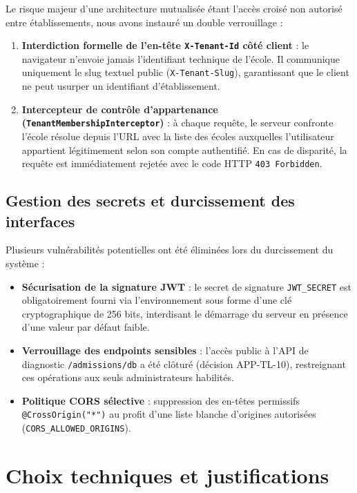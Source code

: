 Le risque majeur d'une architecture mutualisée étant l'accès croisé non autorisé entre établissements, nous avons instauré un double verrouillage :
\begin{enumerate}
    \item \textbf{Interdiction formelle de l'en-tête \texttt{X-Tenant-Id} côté client} : le navigateur n'envoie jamais l'identifiant technique de l'école. Il communique uniquement le slug textuel public (\texttt{X-Tenant-Slug}), garantissant que le client ne peut usurper un identifiant d'établissement.
    \item \textbf{Intercepteur de contrôle d'appartenance (\texttt{TenantMembershipInterceptor})} : à chaque requête, le serveur confronte l'école résolue depuis l'URL avec la liste des écoles auxquelles l'utilisateur appartient légitimement selon son compte authentifié. En cas de disparité, la requête est immédiatement rejetée avec le code HTTP \texttt{403 Forbidden}.
\end{enumerate}

\subsection{Gestion des secrets et durcissement des interfaces}

Plusieurs vulnérabilités potentielles ont été éliminées lors du durcissement du système :
\begin{itemize}
    \item \textbf{Sécurisation de la signature JWT} : le secret de signature \texttt{JWT\_SECRET} est obligatoirement fourni via l'environnement sous forme d'une clé cryptographique de 256 bits, interdisant le démarrage du serveur en présence d'une valeur par défaut faible.
    \item \textbf{Verrouillage des endpoints sensibles} : l'accès public à l'API de diagnostic \nolinkurl{/admissions/db} a été clôturé (décision APP-TL-10), restreignant ces opérations aux seuls administrateurs habilités.
    \item \textbf{Politique CORS sélective} : suppression des en-têtes permissifs \texttt{@CrossOrigin("*")} au profit d'une liste blanche d'origines autorisées (\texttt{CORS\_ALLOWED\_ORIGINS}).
\end{itemize}

\section{Choix techniques et justifications}

